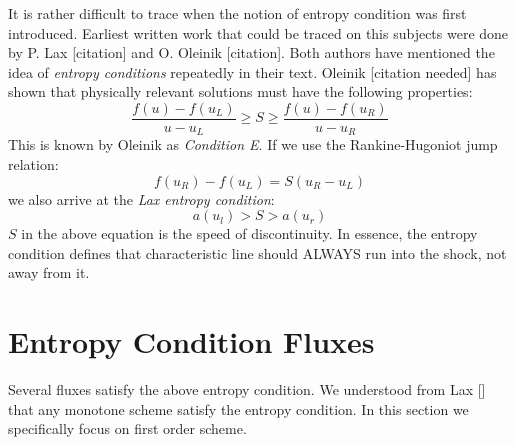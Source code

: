 \documentclass[a4paper]{article}
\begin{document}
It is rather difficult to trace when the notion of entropy condition was first introduced. Earliest written work that could be traced on this subjects were done by P. Lax [citation] and O. Oleinik [citation]. Both authors have mentioned the idea of \textit{entropy conditions} repeatedly in their text. Oleinik [citation needed] has shown that physically relevant solutions must have the following properties:
\begin{equation}
    \frac{f(u) - f(u_L)}{u-u_L} \geq S \geq \frac{f(u) - f(u_R)}{u-u_R}
\end{equation}
This is known by Oleinik as \textit{Condition E}. If we use the Rankine-Hugoniot jump relation:
\begin{equation}
    f(u_R) - f(u_L) = S(u_R - u_L)
\end{equation}
we also arrive at the \textit{Lax entropy condition}:
\begin{equation}
    a(u_l) > S > a(u_r)
\end{equation}
$S$ in the above equation is the speed of discontinuity. In essence, the entropy condition defines that characteristic line should ALWAYS run into the shock, not away from it. 

\section{Entropy Condition Fluxes}
Several fluxes satisfy the above entropy condition. We understood from Lax [] that any monotone scheme satisfy the entropy condition. In this section we specifically focus on first order scheme. 
\end{document}
